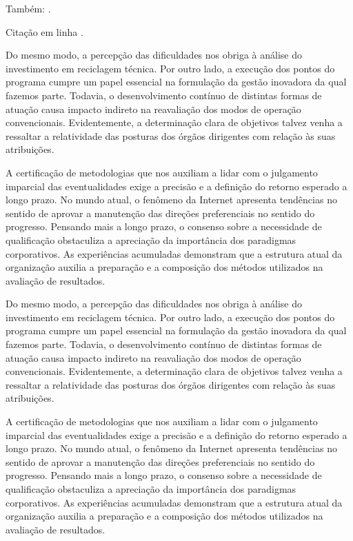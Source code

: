 \documentclass[a4paper,12pt]{udesc}
\begin{document}
Também: \cite{CASS99}. 

Citação em linha .


          Do mesmo modo, a percepção das dificuldades nos obriga à análise do investimento em reciclagem técnica. Por outro lado, a execução dos pontos do programa cumpre um papel essencial na formulação da gestão inovadora da qual fazemos parte. Todavia, o desenvolvimento contínuo de distintas formas de atuação causa impacto indireto na reavaliação dos modos de operação convencionais. Evidentemente, a determinação clara de objetivos talvez venha a ressaltar a relatividade das posturas dos órgãos dirigentes com relação às suas atribuições.




          A certificação de metodologias que nos auxiliam a lidar com o julgamento imparcial das eventualidades exige a precisão e a definição do retorno esperado a longo prazo. No mundo atual, o fenômeno da Internet apresenta tendências no sentido de aprovar a manutenção das direções preferenciais no sentido do progresso. Pensando mais a longo prazo, o consenso sobre a necessidade de qualificação obstaculiza a apreciação da importância dos paradigmas corporativos. As experiências acumuladas demonstram que a estrutura atual da organização auxilia a preparação e a composição dos métodos utilizados na avaliação de resultados.
          
          
          
          Do mesmo modo, a percepção das dificuldades nos obriga à análise do investimento em reciclagem técnica. Por outro lado, a execução dos pontos do programa cumpre um papel essencial na formulação da gestão inovadora da qual fazemos parte. Todavia, o desenvolvimento contínuo de distintas formas de atuação causa impacto indireto na reavaliação dos modos de operação convencionais. Evidentemente, a determinação clara de objetivos talvez venha a ressaltar a relatividade das posturas dos órgãos dirigentes com relação às suas atribuições.




          A certificação de metodologias que nos auxiliam a lidar com o julgamento imparcial das eventualidades exige a precisão e a definição do retorno esperado a longo prazo. No mundo atual, o fenômeno da Internet apresenta tendências no sentido de aprovar a manutenção das direções preferenciais no sentido do progresso. Pensando mais a longo prazo, o consenso sobre a necessidade de qualificação obstaculiza a apreciação da importância dos paradigmas corporativos. As experiências acumuladas demonstram que a estrutura atual da organização auxilia a preparação e a composição dos métodos utilizados na avaliação de resultados.
\end{document}
